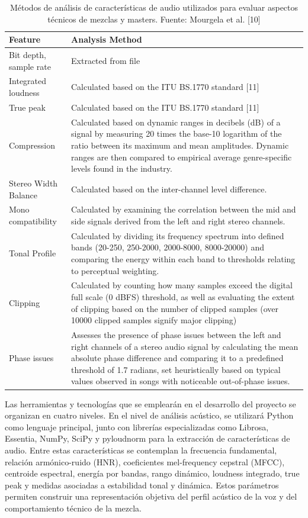 \documentclass[12pt]{article}
\begin{document}
\begin{table}[h!]
\centering
\caption{Métodos de análisis de características de audio utilizados para evaluar aspectos técnicos de mezclas y masters. Fuente: Mourgela et al. [10]}
\label{tab:mourgela}
\begin{tabular}{|p{3.2cm}|p{9.5cm}|}
\hline
\textbf{Feature} & \textbf{Analysis Method} \\
\hline
Bit depth, sample rate & Extracted from file \\
\hline
Integrated loudness & Calculated based on the ITU BS.1770 standard [11] \\
\hline
True peak & Calculated based on the ITU BS.1770 standard [11] \\
\hline
Compression & Calculated based on dynamic ranges in decibels (dB) of a signal by measuring 20 times the base-10 logarithm of the ratio between its maximum and mean amplitudes. Dynamic ranges are then compared to empirical average genre-specific levels found in the industry. \\
\hline
Stereo Width Balance & Calculated based on the inter-channel level difference. \\
\hline
Mono compatibility & Calculated by examining the correlation between the mid and side signals derived from the left and right stereo channels. \\
\hline
Tonal Profile & Calculated by dividing its frequency spectrum into defined bands (20-250, 250-2000, 2000-8000, 8000-20000) and comparing the energy within each band to thresholds relating to perceptual weighting. \\
\hline
Clipping & Calculated by counting how many samples exceed the digital full scale (0 dBFS) threshold, as well as evaluating the extent of clipping based on the number of clipped samples (over 10000 clipped samples signify major clipping) \\
\hline
Phase issues & Assesses the presence of phase issues between the left and right channels of a stereo audio signal by calculating the mean absolute phase difference and comparing it to a predefined threshold of 1.7 radians, set heuristically based on typical values observed in songs with noticeable out-of-phase issues. \\
\hline
\end{tabular}
\end{table}

Las herramientas y tecnologías que se emplearán en el desarrollo del proyecto se organizan en cuatro niveles. En el nivel de análisis acústico, se utilizará Python como lenguaje principal, junto con librerías especializadas como Librosa, Essentia, NumPy, SciPy y pyloudnorm para la extracción de características de audio. Entre estas características se contemplan la frecuencia fundamental, relación armónico-ruido (HNR), coeficientes mel-frequency cepstral (MFCC), centroide espectral, energía por bandas, rango dinámico, loudness integrado, true peak y medidas asociadas a estabilidad tonal y dinámica. Estos parámetros permiten construir una representación objetiva del perfil acústico de la voz y del comportamiento técnico de la mezcla.
\end{document}
